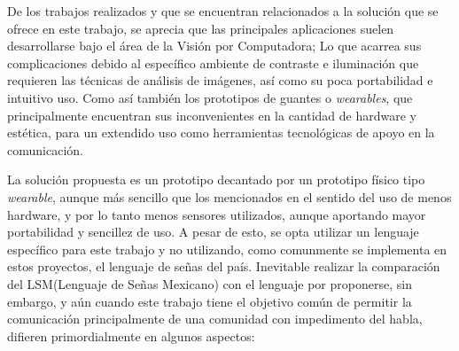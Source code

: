 \hfill \break
\justifying
De los trabajos realizados y que se encuentran relacionados a la solución que se ofrece en este trabajo, se aprecia que las principales aplicaciones suelen desarrollarse bajo el área de la Visión por Computadora; Lo que acarrea sus complicaciones debido al específico ambiente de contraste e iluminación que requieren las técnicas de análisis de imágenes, así como su poca portabilidad e intuitivo uso. Como así también los prototipos de guantes o \textit{wearables}, que principalmente encuentran sus inconvenientes en la cantidad de hardware y estética, para un extendido uso como herramientas tecnológicas de apoyo en la comunicación.

\hfill \break
\justifying
La solución propuesta es un prototipo decantado por un prototipo físico tipo \textit{wearable}, aunque más sencillo que los mencionados en el sentido del uso de menos hardware, y por lo tanto menos sensores utilizados, aunque aportando mayor portabilidad y sencillez de uso. A pesar de esto, se opta utilizar un lenguaje específico para este trabajo y no utilizando, como comunmente se implementa en estos proyectos, el lenguaje de señas del país.
Inevitable realizar la comparación del LSM(Lenguaje de Señas Mexicano) con el lenguaje por proponerse, sin embargo, y aún cuando este trabajo tiene el objetivo común de permitir la comunicación principalmente de una comunidad con impedimento del habla, difieren primordialmente en algunos aspectos: 

